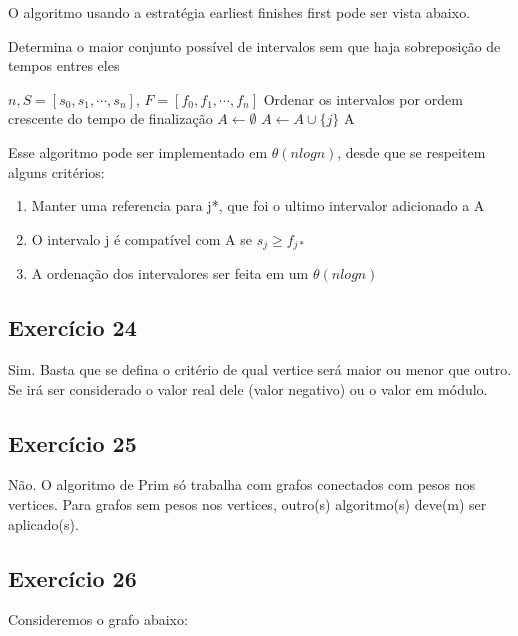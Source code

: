 O algoritmo usando a estratégia earliest finishes first pode ser vista abaixo.

\begin{algorithm}
  \caption{Determina o maior conjunto possível de intervalos sem que haja sobreposição
  de tempos entres eles}
  \begin{algorithmic}
    \REQUIRE $n, S=[s_{0}, s_{1}, \cdots, s_{n}]$, $F=[f_{0}, f_{1}, \cdots, f_{n}]$
    \STATE Ordenar os intervalos por ordem crescente do tempo de finalização
    \STATE $A \leftarrow \emptyset$
            \STATE $A \leftarrow A \cup \lbrace j \rbrace$
      \ENDIF
    \ENDFOR
    \RETURN A
  \end{algorithmic}
\end{algorithm}

\newpage
Esse algoritmo pode ser implementado em $\theta(n log n)$, desde que se respeitem alguns
critérios:
\begin{enumerate}
  \item Manter uma referencia para j*, que foi o ultimo intervalor adicionado a A
  \item O intervalo j é compatível com A se $s_{j} \ge f_{j*}$
  \item A ordenação dos intervalores ser feita em um $\theta(n log n)$
\end{enumerate}

\subsection{Exercício 24}\label{sec:exer24}
Sim. Basta que se defina o critério de qual vertice será maior ou menor que outro.
Se irá ser considerado o valor real dele (valor negativo) ou o valor em módulo.

\subsection{Exercício 25}\label{sec:exer25}
Não. O algoritmo de Prim só trabalha com grafos conectados com pesos nos vertices.
Para grafos sem pesos nos vertices, outro(s) algoritmo(s) deve(m) ser aplicado(s).

\subsection{Exercício 26}\label{sec:exer26}

Consideremos o grafo abaixo:

